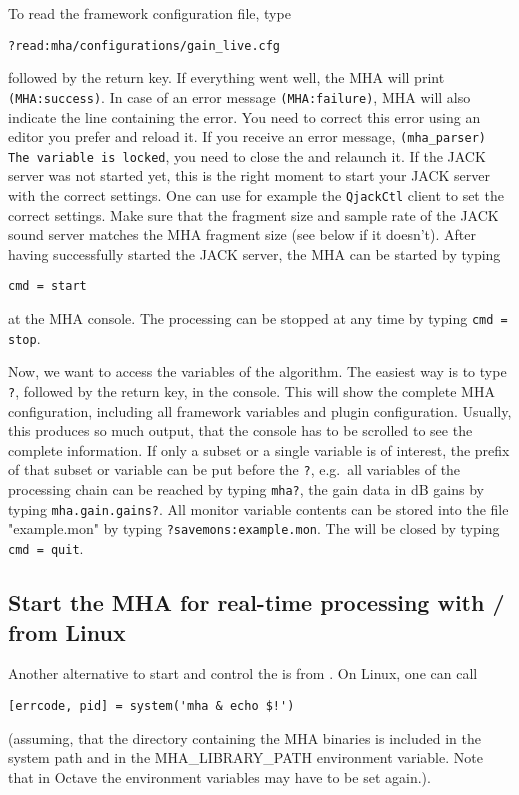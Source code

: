 To read the framework configuration file, type
\begin{verbatim}
?read:mha/configurations/gain_live.cfg
\end{verbatim}
followed by the return key. If everything went well, the MHA will print
\verb!(MHA:success)!. In case of an error message \verb!(MHA:failure)!, MHA 
will also indicate the line containing the error. You need to correct this 
error using an editor you prefer and  reload it. If you receive an error 
message, \verb!(mha_parser) The variable is locked!, you need to close the 
\mhad{} and relaunch it. If the JACK server was not started yet, this is the
right moment to start your JACK server with the correct settings. One can use 
for example the \verb!QjackCtl! client to set the correct settings.
Make sure that the fragment size and sample rate of the JACK
sound server matches the MHA fragment size (see below if it
doesn't). After having successfully started the JACK server, the MHA
can be started by typing
\begin{verbatim}
cmd = start
\end{verbatim}
at the MHA console. The processing can be stopped at any time by
typing \verb!cmd = stop!.

Now, we want to access the variables of the algorithm. The easiest way
is to type \verb!?!, followed by the return key, in the console. This
will show the complete MHA configuration, including all framework
variables and plugin configuration. Usually, this
produces so much output, that the console has to be scrolled to see
the complete information. If only a subset or a single variable is of
interest, the prefix of that subset or variable can be put before the
\verb!?!, e.g.\ all variables of the processing chain can be reached
by typing \newline\verb!mha?!, the gain data in dB gains
by typing \newline\verb!mha.gain.gains?!. All monitor variable contents can
be stored into the file "example.mon" by typing
\verb!?savemons:example.mon!. The \mhad{} will be closed
by typing \verb!cmd = quit!.

\subsection{Start the MHA for real-time processing with \Octave{}/\Matlab{} from Linux}%
%
Another alternative to start and control the \mhad{} is from \Matlab{}. On Linux, one can call
\begin{verbatim}
[errcode, pid] = system('mha & echo $!')
\end{verbatim}
(assuming, that the directory containing the MHA binaries is included
in the system path and in the MHA\_LIBRARY\_PATH environment
variable. Note that in Octave the environment variables
may have to be set again.).

